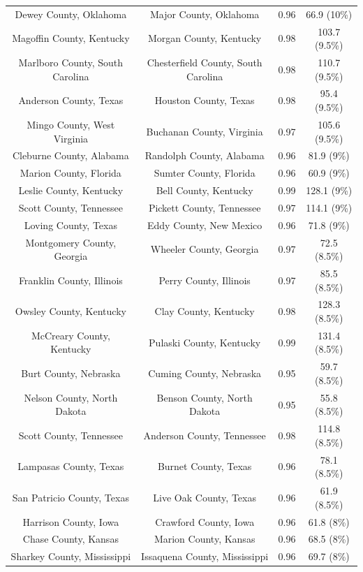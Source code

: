 \begin{longtable}{cccc}
  Dewey County, Oklahoma & Major County, Oklahoma & 0.96 & 66.9 (10\%) \\ 
  Magoffin County, Kentucky & Morgan County, Kentucky & 0.98 & 103.7 (9.5\%) \\ 
  Marlboro County, South Carolina & Chesterfield County, South Carolina & 0.98 & 110.7 (9.5\%) \\ 
  Anderson County, Texas & Houston County, Texas & 0.98 & 95.4 (9.5\%) \\ 
  Mingo County, West Virginia & Buchanan County, Virginia & 0.97 & 105.6 (9.5\%) \\ 
  Cleburne County, Alabama & Randolph County, Alabama & 0.96 & 81.9 (9\%) \\ 
  Marion County, Florida & Sumter County, Florida & 0.96 & 60.9 (9\%) \\ 
  Leslie County, Kentucky & Bell County, Kentucky & 0.99 & 128.1 (9\%) \\ 
  Scott County, Tennessee & Pickett County, Tennessee & 0.97 & 114.1 (9\%) \\ 
  Loving County, Texas & Eddy County, New Mexico & 0.96 & 71.8 (9\%) \\ 
  Montgomery County, Georgia & Wheeler County, Georgia & 0.97 & 72.5 (8.5\%) \\ 
  Franklin County, Illinois & Perry County, Illinois & 0.97 & 85.5 (8.5\%) \\ 
  Owsley County, Kentucky & Clay County, Kentucky & 0.98 & 128.3 (8.5\%) \\ 
  McCreary County, Kentucky & Pulaski County, Kentucky & 0.99 & 131.4 (8.5\%) \\ 
  Burt County, Nebraska & Cuming County, Nebraska & 0.95 & 59.7 (8.5\%) \\ 
  Nelson County, North Dakota & Benson County, North Dakota & 0.95 & 55.8 (8.5\%) \\ 
  Scott County, Tennessee & Anderson County, Tennessee & 0.98 & 114.8 (8.5\%) \\ 
  Lampasas County, Texas & Burnet County, Texas & 0.96 & 78.1 (8.5\%) \\ 
  San Patricio County, Texas & Live Oak County, Texas & 0.96 & 61.9 (8.5\%) \\ 
  Harrison County, Iowa & Crawford County, Iowa & 0.96 & 61.8 (8\%) \\ 
  Chase County, Kansas & Marion County, Kansas & 0.96 & 68.5 (8\%) \\ 
  Sharkey County, Mississippi & Issaquena County, Mississippi & 0.96 & 69.7 (8\%) \\ 

\end{longtable}
